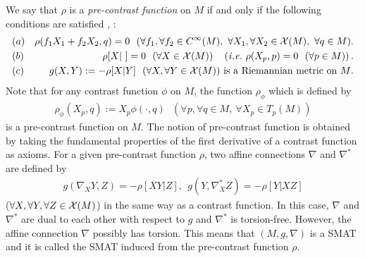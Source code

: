 \documentclass[graybox]{svmult}
\begin{document}
We say that $\rho$ is a {\em pre-contrast function} on $M$ if and only if the following
conditions are satisfied \cite{Ma2}, \cite{HM}:
%
\begin{eqnarray*}
   &(a)& \rho(f_1X_1+f_2X_2,q) = 0 \ \
         (\forall f_1, \forall f_2 \in C^{\infty}(M), \ \forall X_1, \forall X_2 \in {\cal X}(M), \ \forall q \in M). \\
   &(b)& \rho[X| \ ] = 0 \ \ (\forall X \in {\cal X}(M)) \ \ \
         \left({\it i.e.} \ \rho(X_p,p)=0 \ \ (\forall p \in M)\right). \\
   &(c)& \mbox{$g(X,Y) := -\rho[X|Y] \ \ (\forall X, \forall Y \in {\cal X}(M))$
               is a Riemannian metric on $M$}.
\end{eqnarray*}
%
Note that for any contrast function $\phi$ on $M$, the function $\rho_{\phi}$ which is defined by 
%
\begin{eqnarray*}
   \rho_{\phi}(X_p,q) := X_p\phi(\cdot,q) \ \ \ (\forall p, \forall q \in M, \ \forall X_p \in T_p(M))
\end{eqnarray*}
%
is a pre-contrast function on $M$.
The notion of pre-contrast function is obtained by taking the fundamental properties of the first
derivative of a contrast function as axioms.
For a given pre-contrast function $\rho$, two affine connections $\nabla$ and $\nabla^{\ast}$ are
defined by
%
\begin{eqnarray*}
   g(\nabla_{X}Y,Z) = -\rho[XY|Z], \ \ g(Y,\nabla^{\ast}_{X}Z) = -\rho[Y|XZ]
\end{eqnarray*}
%
($\forall X, \forall Y, \forall Z \in {\cal X}(M)$) in the same way as a contrast function.
In this case, $\nabla$ and $\nabla^{\ast}$ are dual to each other with respect to $g$ and
$\nabla^{\ast}$ is torsion-free. However, the affine connection $\nabla$ possibly has
torsion. This means that $(M,g,\nabla)$ is a SMAT and it is called the SMAT induced from
the pre-contrast function $\rho$.

\end{document}
